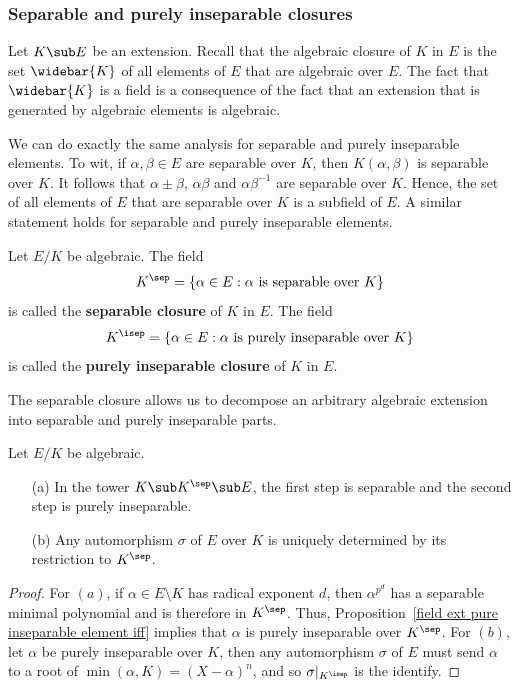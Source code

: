 \subsubsection{Separable and purely inseparable closures}
Let $K\sub E$ be an extension. Recall that the algebraic closure of $K$ in $E$ is the set $\widebar{K}$ of all elements of $E$ that are algebraic over $E$. The fact that $\widebar{K}$ is a field is a consequence of the fact that an extension that is generated by algebraic elements is algebraic.\par
We can do exactly the same analysis for separable and purely inseparable
elements. To wit, if $\alpha,\beta\in E$ are separable over $K$, then $K(\alpha,\beta)$ is separable over $K$. It follows that $\alpha\pm\beta$, $\alpha\beta$ and $\alpha\beta^{-1}$ are separable over $K$. Hence, the set of all elements of $E$ that are separable over $K$ is a subfield of $E$. A similar statement holds for separable and purely inseparable elements.
\begin{definition}
Let $E/K$ be algebraic. The field
\[K^{\sep}=\{\alpha\in E:\text{$\alpha$ is separable over $K$}\}\]
is called the \textbf{separable closure} of $K$ in $E$. The field
\[K^{\isep}=\{\alpha\in E:\text{$\alpha$ is purely inseparable over $K$}\}\]
is called the \textbf{purely inseparable closure} of $K$ in $E$.
\end{definition}
The separable closure allows us to decompose an arbitrary algebraic extension into separable and purely inseparable parts.
\begin{proposition}\label{field ext separable closure prop}
Let $E/K$ be algebraic.
\begin{itemize}
\item[(a)] In the tower $K\sub K^{\sep}\sub E$, the first step is separable and the second step is purely inseparable.
\item[(b)] Any automorphism $\sigma$ of $E$ over $K$ is uniquely determined by its restriction to $K^{\sep}$.
\end{itemize}
\end{proposition}
\begin{proof}
For $(a)$, if $\alpha\in E\setminus K$ has radical exponent $d$, then $\alpha^{p^d}$ has a separable minimal polynomial and is therefore in $K^{\sep}$. Thus, Proposition~\ref{field ext pure inseparable element iff} implies that $\alpha$ is purely inseparable over $K^{\sep}$. For $(b)$, let $\alpha$ be purely inseparable over $K$, then any automorphism $\sigma$ of $E$ must send $\alpha$ to a root of $\min(\alpha,K)=(X-\alpha)^{n}$, and so $\sigma|_{K^{\isep}}$ is the identify.
\end{proof}
